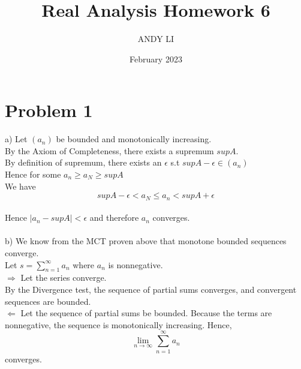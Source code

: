 \documentclass{article}
\title{Real Analysis Homework 6}
\author{ANDY LI}
\date{February 2023}
\begin{document}
\maketitle
\section*{Problem 1}
a) Let $(a_n)$ be bounded and monotonically increasing.
\\By the Axiom of Completeness, there exists a supremum $supA$.
\\By definition of supremum, there exists an $\epsilon$ s.t $supA - \epsilon \in (a_n)$
\\Hence for some $a_n \geq a_N \geq supA$
\\We have $$supA - \epsilon < a_N \leq a_n < supA + \epsilon$$
\\Hence $|a_n - supA| < \epsilon$ and therefore $a_n$ converges.
\\
\\b) We know from the MCT proven above that monotone bounded sequences converge.
\\Let $s = \sum_{n=1}^{\infty} a_n$ where $a_n$ is nonnegative.
\\$\Rightarrow$ Let the series converge.
\\By the Divergence test, the sequence of partial sums converges, and convergent sequences are bounded.
\\$\Leftarrow$ Let the sequence of partial sums be bounded. Because the terms are nonnegative, the sequence is monotonically increasing. Hence, $$\lim_{n \to \infty} \sum_{n=1}^{\infty} a_n$$ converges.
\end{document}
